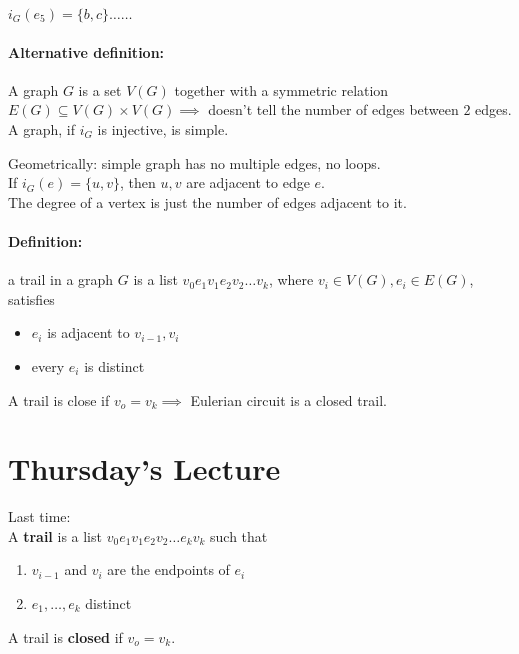 \documentclass[a4paper, 11pt, twoside]{article}
\begin{document}
$i_G(e_5)=\{b, c\} \dots \dots $\\

\paragraph{Alternative definition:} A graph $G$ is a set $V(G)$ together with a symmetric relation $E(G)\subseteq V(G)\times V(G) \implies$ doesn't tell the number of edges between $2$ edges.\\

A graph, if $i_G$ is injective, is simple.

Geometrically: simple graph has no multiple edges, no loops.\\

If $i_G(e)=\{u, v\}$, then $u,v$ are adjacent to edge $e$.\\

The degree of a vertex is just the number of edges adjacent to it.\\

\paragraph{Definition:} a trail in a graph $G$ is a list $v_0e_1v_1e_2v_2\dots v_k$, where $v_i\in V(G), e_i \in E(G)$, satisfies

\begin{itemize}
	\item $e_i$ is adjacent to $v_{i-1}, v_i$
	\item every $e_i$ is distinct
\end{itemize}

A trail is close if $v_o=v_k\implies$ Eulerian circuit is a closed trail.

\section{Thursday's Lecture}

Last time:\\

A \textbf{trail} is a list $v_0e_1v_1e_2v_2\dots e_kv_k$ such that 

\begin{enumerate}
	\item $v_{i-1}$ and $v_i$ are the endpoints of $e_i$
	\item $e_1,\dots, e_k$ distinct
\end{enumerate}

A trail is \textbf{closed} if $v_o=v_k$.\\
\end{document}
